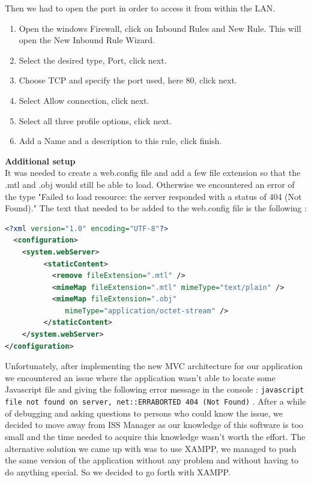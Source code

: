\documentclass{scrbook}
\begin{document}
Then we had to open the port in order to access it from within the LAN.
\begin{enumerate}
  \item Open the windows Firewall, click on Inbound Rules and New Rule. This will open the New Inbound Rule Wizard.
  \item Select the desired type, Port, click next.
  \item Choose TCP and specify the port used, here 80, click next.
  \item Select Allow connection, click next.
  \item Select all three profile options, click next.
  \item Add a Name and a description to this rule, click finish.
\end{enumerate}

\textbf{Additional setup}\\

It was needed to create a web.config file and add a few file extension so that the .mtl and .obj would still be able to load. 
Otherwise we encountered an error of the type "Failed to load resource: the server responded with a status of 404 (Not Found)." 
The text that needed to be added to the web.config file is the following : \\
\begin{lstlisting}[language=XML, basicstyle=\ttfamily\small]
<?xml version="1.0" encoding="UTF-8"?>
  <configuration>
    <system.webServer>
         <staticContent>
           <remove fileExtension=".mtl" />
           <mimeMap fileExtension=".mtl" mimeType="text/plain" />
           <mimeMap fileExtension=".obj" 
              mimeType="application/octet-stream" />
         </staticContent>
    </system.webServer>
</configuration>
\end{lstlisting}

Unfortunately, after implementing the new MVC architecture for our application we encountered an issue where the application wasn't able to locate some Javascript file and giving the following error message in the console : 
\texttt{javascript file not found on server, net::ERR\textunderscore ABORTED 404 (Not Found)} .  After a while of debugging and asking questions to persons who could know the issue, 
we decided to move away from ISS Manager as our knowledge of this software is too small and the time needed to acquire this knowledge wasn't worth the effort. 
The alternative solution we came up with was to use XAMPP, we managed to push the same version of the application without any problem and without having to do anything special. So we decided to go forth with XAMPP.
\end{document}
